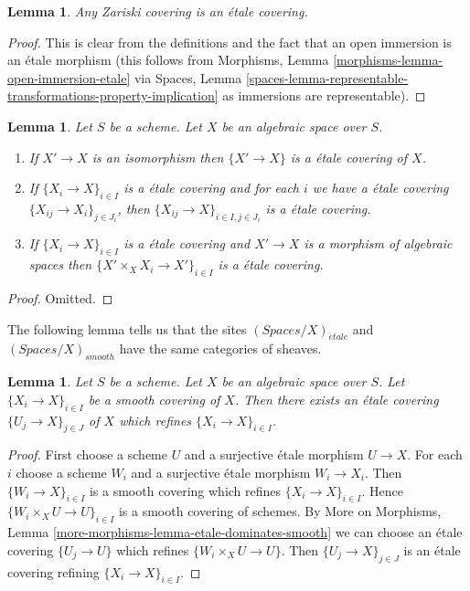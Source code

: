 \documentclass{stacks-project}
\theoremstyle{plain}
\newtheorem{lemma}[subsection]{Lemma}
\theoremstyle{definition}
\theoremstyle{remark}
\numberwithin{equation}{subsection}
\def\etale{{\acute{e}tale}}
\begin{document}
\begin{lemma}
\label{lemma-zariski-etale}
Any Zariski covering is an \'etale covering.
\end{lemma}

\begin{proof}
This is clear from the definitions and the fact that an open immersion
is an \'etale morphism (this follows from
Morphisms, Lemma \ref{morphisms-lemma-open-immersion-etale} via
Spaces, Lemma
\ref{spaces-lemma-representable-transformations-property-implication}
as immersions are representable).
\end{proof}

\begin{lemma}
\label{lemma-etale}
Let $S$ be a scheme.
Let $X$ be an algebraic space over $S$.
\begin{enumerate}
\item If $X' \to X$ is an isomorphism then $\{X' \to X\}$
is a \'etale covering of $X$.
\item If $\{X_i \to X\}_{i\in I}$ is a \'etale covering and for each
$i$ we have a \'etale covering $\{X_{ij} \to X_i\}_{j\in J_i}$, then
$\{X_{ij} \to X\}_{i \in I, j\in J_i}$ is a \'etale covering.
\item If $\{X_i \to X\}_{i\in I}$ is a \'etale covering
and $X' \to X$ is a morphism of algebraic spaces then
$\{X' \times_X X_i \to X'\}_{i\in I}$ is a \'etale covering.
\end{enumerate}
\end{lemma}

\begin{proof}
Omitted.
\end{proof}

\noindent
The following lemma tells us that the sites
$(\textit{Spaces}/X)_\etale$ and $(\textit{Spaces}/X)_{smooth}$
have the same categories of sheaves.

\begin{lemma}
\label{lemma-etale-dominates-smooth}
Let $S$ be a scheme. Let $X$ be an algebraic space over $S$.
Let $\{X_i \to X\}_{i \in I}$ be a smooth covering of $X$.
Then there exists an \'etale covering $\{U_j \to X\}_{j \in J}$
of $X$ which refines $\{X_i \to X\}_{i \in I}$.
\end{lemma}

\begin{proof}
First choose a scheme $U$ and a surjective \'etale morphism $U \to X$.
For each $i$ choose a scheme $W_i$ and a surjective \'etale morphism
$W_i \to X_i$. Then $\{W_i \to X\}_{i \in I}$ is a smooth covering
which refines $\{X_i \to X\}_{i \in I}$. Hence
$\{W_i \times_X U \to U\}_{i \in I}$ is a smooth covering of schemes.
By More on Morphisms, Lemma \ref{more-morphisms-lemma-etale-dominates-smooth}
we can choose an \'etale covering $\{U_j \to U\}$ which refines
$\{W_i \times_X U \to U\}$. Then $\{U_j \to X\}_{j \in J}$
is an \'etale covering refining $\{X_i \to X\}_{i \in I}$.
\end{proof}
\end{document}
